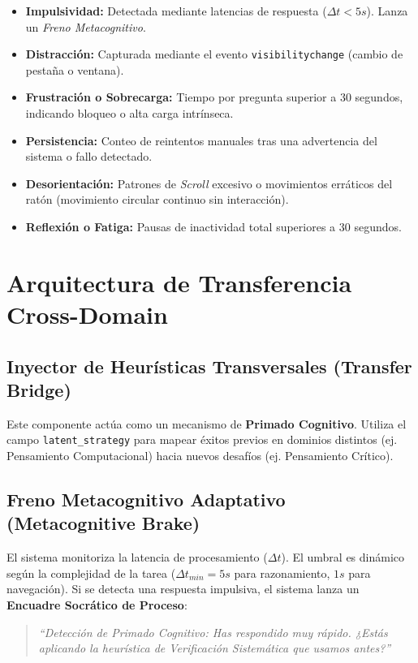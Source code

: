 \documentclass{article}
\begin{document}
\begin{itemize}
    \item \textbf{Impulsividad:} Detectada mediante latencias de respuesta ($\Delta t < 5s$). Lanza un \textit{Freno Metacognitivo}.
    \item \textbf{Distracción:} Capturada mediante el evento \texttt{visibilitychange} (cambio de pestaña o ventana).
    \item \textbf{Frustración o Sobrecarga:} Tiempo por pregunta superior a 30 segundos, indicando bloqueo o alta carga intrínseca.
    \item \textbf{Persistencia:} Conteo de reintentos manuales tras una advertencia del sistema o fallo detectado.
    \item \textbf{Desorientación:} Patrones de \textit{Scroll} excesivo o movimientos erráticos del ratón (movimiento circular continuo sin interacción).
    \item \textbf{Reflexión o Fatiga:} Pausas de inactividad total superiores a 30 segundos.
\end{itemize}

\section{Arquitectura de Transferencia Cross-Domain}

\subsection{Inyector de Heurísticas Transversales (Transfer Bridge)}
Este componente actúa como un mecanismo de \textbf{Primado Cognitivo}. Utiliza el campo \texttt{latent\_strategy} para mapear éxitos previos en dominios distintos (ej. Pensamiento Computacional) hacia nuevos desafíos (ej. Pensamiento Crítico).

\subsection{Freno Metacognitivo Adaptativo (Metacognitive Brake)}
El sistema monitoriza la latencia de procesamiento ($\Delta t$). El umbral es dinámico según la complejidad de la tarea ($\Delta t_{min} = 5s$ para razonamiento, $1s$ para navegación). Si se detecta una respuesta impulsiva, el sistema lanza un \textbf{Encuadre Socrático de Proceso}:
\begin{quote}
    \textit{``Detección de Primado Cognitivo: Has respondido muy rápido. ¿Estás aplicando la heurística de Verificación Sistemática que usamos antes?''}
\end{quote}
\end{document}
